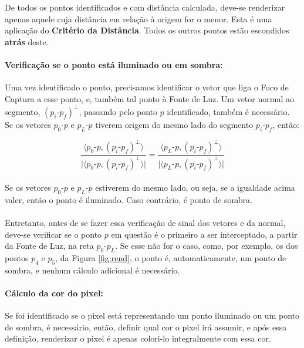 \documentclass{article}
\begin{document}
	De todos os pontos identificados e com distância calculada, deve-se renderizar apenas aquele cuja distância em relação à origem for o menor. Esta é uma aplicação do \textbf{Critério da Distância}. Todos os outros pontos estão escondidos \textbf{atrás} deste.
	
	\paragraph{Verificação se o ponto está iluminado ou em sombra:}
	Uma vez identificado o ponto, precisamos identificar o vetor que liga o Foco de Captura a esse ponto, e, também tal ponto à Fonte de Luz. Um vetor normal ao segmento,  $(p_i\text{-}p_f)^\bot$, passando pelo ponto $p$ identificado, também é necessário. Se os vetores $p_0$-$p$ e $p_{L}$-$p$ tiverem origem do mesmo lado do segmento $p_i$-$p_f$, então:
	
	$$\frac{\langle p_0\text{-}p , (p_i\text{-}p_f)^\bot \rangle}{\lvert \langle p_0\text{-}p , (p_i\text{-}p_f)^\bot \rangle \rvert} = \frac{\langle p_L\text{-}p , (p_i\text{-}p_f)^\bot \rangle}{\lvert \langle p_L\text{-}p , (p_i\text{-}p_f)^\bot \rangle \rvert}$$
	
	\paragraph{}
	Se os vetores $p_0\text{-}p$ e $p_L\text{-}p$ estiverem do mesmo lado, ou seja, se a igualdade acima valer, então o ponto é iluminado. Caso contrário, é ponto de sombra.
	
	\paragraph{}
	Entretanto, antes de se fazer essa verificação de sinal dos vetores e da normal, deve-se verificar se o ponto $p$ em questão é o primeiro a ser interceptado, a partir da Fonte de Luz, na reta $p_0$-$p_L$. Se esse não for o caso, como, por exemplo, os dos pontos $p_4$ e $p_5$, da Figura \ref{fig:rend}, o ponto é, automaticamente, um ponto de sombra, e nenhum cálculo adicional é necessário.
	
	\paragraph{Cálculo da cor do pixel: }
	Se foi identificado se o pixel está representando um ponto iluminado ou um ponto de sombra, é necessário, então, definir qual cor o pixel irá assumir, e após essa definição, renderizar o pixel é apenas colori-lo integralmente com essa cor.
	
\end{document}
